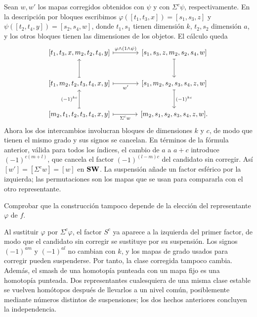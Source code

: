 Sean $w,w'$ los mapas corregidos obtenidos con $\psi$ y con $\Sigma^c\psi$, respectivamente. En la descripción por bloques escribimos $\varphi([t_1,t_3,x])=[s_1,s_3,z]$ y $\psi([t_2,t_4,y])=[s_2,s_4,w]$, donde $t_1,s_1$ tienen dimensión $k$, $t_2,s_2$ dimensión $a$, y los otros bloques tienen las dimensiones de los objetos. El cálculo queda
\[
\begin{tikzcd}[column sep=large,row sep=large]
{[t_1,t_3,x,m_2,t_2,t_4,y]} \arrow[r,mapsto,"\varphi\wedge(1\wedge\psi)"] & {[s_1,s_3,z,m_2,s_2,s_4,w]} \arrow[d,mapsto]\\
{[t_1,m_2,t_2,t_3,t_4,x,y]} \arrow[u,mapsto] \arrow[r,mapsto,"w'"'] & {[s_1,m_2,s_2,s_3,s_4,z,w]} \arrow[d,mapsto,"(-1)^{kc}"]\\
{[m_2,t_1,t_2,t_3,t_4,x,y]} \arrow[u,mapsto,"(-1)^{kc}"] \arrow[r,mapsto,"\Sigma^cw"'] & {[m_2,s_1,s_2,s_3,s_4,z,w]}.
\end{tikzcd}
\]
Ahora los dos intercambios involucran bloques de dimensiones $k$ y $c$, de modo que tienen el mismo grado y sus signos se cancelan. En términos de la fórmula anterior, válida para todos los índices, el cambio de $a$ a $a+c$ introduce $(-1)^{c(m+l)}$, que cancela el factor $(-1)^{(l-m)c}$ del candidato sin corregir. Así $[w']=[\Sigma^cw]=[w]$ en $\mathbf{SW}$. La suspensión añade un factor esférico por la izquierda; las permutaciones son los mapas que se usan para compararla con el otro representante.

\begin{ejer}
Comprobar que la construcción tampoco depende de la elección del representante $\varphi$ de $f$.
\end{ejer}
\begin{sol}
Al sustituir $\varphi$ por $\Sigma^c\varphi$, el factor $S^c$ ya aparece a la izquierda del primer factor, de modo que el candidato sin corregir se sustituye por su suspensión. Los signos $(-1)^{am}$ y $(-1)^{al}$ no cambian con $k$, y los mapas de grado usados para corregir pueden suspenderse. Por tanto, la clase corregida tampoco cambia. Además, el smash de una homotopía punteada con un mapa fijo es una homotopía punteada. Dos representantes cualesquiera de una misma clase estable se vuelven homótopos después de llevarlos a un nivel común, posiblemente mediante números distintos de suspensiones; los dos hechos anteriores concluyen la independencia.
\end{sol}

